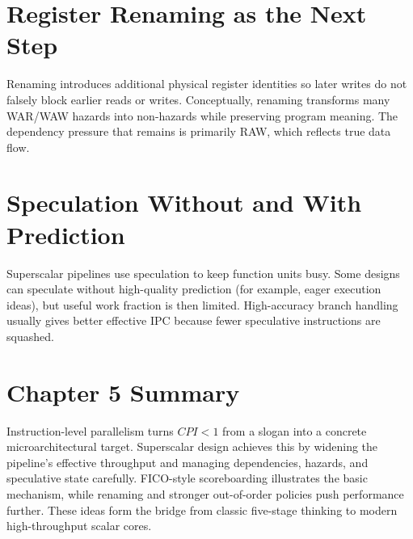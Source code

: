 \section{Register Renaming as the Next Step}\label{sec:ilp-renaming}
Renaming introduces additional physical register identities so later writes do not falsely block earlier reads or writes.
Conceptually, renaming transforms many WAR/WAW hazards into non-hazards while preserving program meaning.
The dependency pressure that remains is primarily RAW, which reflects true data flow.

\section{Speculation Without and With Prediction}\label{sec:ilp-speculation}
Superscalar pipelines use speculation to keep function units busy.
Some designs can speculate without high-quality prediction (for example, eager execution ideas), but useful work fraction is then limited.
High-accuracy branch handling usually gives better effective IPC because fewer speculative instructions are squashed.

\section{Chapter 5 Summary}\label{sec:chapter5-summary-ilp}
Instruction-level parallelism turns $CPI<1$ from a slogan into a concrete microarchitectural target.
Superscalar design achieves this by widening the pipeline's effective throughput and managing dependencies, hazards, and speculative state carefully.
FICO-style scoreboarding illustrates the basic mechanism, while renaming and stronger out-of-order policies push performance further.
These ideas form the bridge from classic five-stage thinking to modern high-throughput scalar cores.
